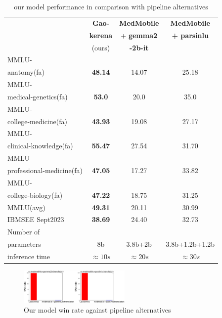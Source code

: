 \documentclass[conference]{IEEEtran}
\begin{document}
	\begin{table}[ht]
		\centering
		\caption{our model performance 
			in comparison with pipeline alternatives}
		\begin{tabular}{|l|c|c|c|}  %
			\hline
			\textbf{} & \textbf{Gao-} 
			& \textbf{MedMobile} & \textbf{MedMobile} \\ 
			& \textbf{kerena} & + \textbf{gemma2} & \textbf{+ parsinlu} \\
			& (ours)  & \textbf{-2b-it} &  \\ \hline
			MMLU- &  &  &  \\ 
			anatomy(fa)  & \textbf{48.14} & 14.07 & 25.18  \\ \hline
			MMLU- &    &  &  \\
			medical-genetics(fa) & \textbf{53.0} & 20.0 & 35.0 \\ \hline
			MMLU- &  &    &  \\
			college-medicine(fa) & \textbf{43.93} & 19.08 & 27.17 \\ \hline
			MMLU- &    &  &  \\
			clinical-knowledge(fa)& \textbf{55.47} & 27.54 & 31.70 \\ \hline
			MMLU- &  &  &  \\
			professional-medicine(fa)& \textbf{47.05} & 17.27 & 33.82 \\ \hline
			MMLU- &  &  &  \\
			college-biology(fa)& \textbf{47.22} & 18.75 & 31.25 \\ \hline
			MMLU(avg) & \textbf{49.31} & 20.11 & 30.99 \\ \hline
			IBMSEE Sept2023 & \textbf{38.69}  & 24.40 & 32.73  \\ \hline
			Number of&  &  &  \\
			parameters & 8b & 3.8b+2b & 3.8b+1.2b+1.2b \\ \hline
			inference time & $\approx 10s$ & $\approx 20s$ & $\approx 30s$ \\  \hline
		\end{tabular}
		\label{tab:model_results_vs_pipeline_alternative}
	\end{table}
	
	\begin{figure}[htbp]
		\centerline{\includegraphics[width=0.48\textwidth]{fig4.png}}
		\caption{Our model win rate against pipeline alternatives}
		\label{fig4}
	\end{figure}
\end{document}
